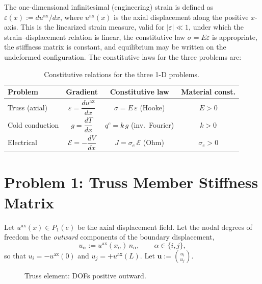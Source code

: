 \documentclass[11pt, a4paper]{article}
\begin{document}
The one-dimensional infinitesimal (engineering) strain is defined as $\varepsilon(x):=du^{\mathrm{ax}}/dx$, where $u^{\mathrm{ax}}(x)$ is the axial displacement along the positive $x$-axis.  This is the linearized strain measure, valid for $|\varepsilon|\ll 1$, under which the strain--displacement relation is linear, the constitutive law $\sigma=E\varepsilon$ is appropriate, the stiffness matrix is constant, and equilibrium may be written on the undeformed configuration.  The constitutive laws for the three problems are:

\begin{table}[H]
\centering
\renewcommand{\arraystretch}{1.5}
\begin{tabular}{@{}lccc@{}}
\toprule
\textbf{Problem} & \textbf{Gradient} & \textbf{Constitutive law} & \textbf{Material const.}\\
\midrule
Truss (axial) & $\varepsilon=\dfrac{du^{\mathrm{ax}}}{dx}$ & $\sigma=E\,\varepsilon$ \;\;(Hooke) & $E>0$\\[6pt]
Cold conduction & $g=\dfrac{dT}{dx}$ & $q^c=k\,g$ \;\;(inv.\ Fourier) & $k>0$\\[6pt]
Electrical & $\mathcal{E}=-\dfrac{dV}{dx}$ & $J=\sigma_e\,\mathcal{E}$ \;\;(Ohm) & $\sigma_e>0$\\
\bottomrule
\end{tabular}
\caption{Constitutive relations for the three 1-D problems.}
\label{tab:const}
\end{table}

\section{Problem 1: Truss Member Stiffness Matrix}

Let $u^{\mathrm{ax}}(x)\in P_1(e)$ be the axial displacement field.  Let the nodal degrees of freedom be the \emph{outward} components of the boundary displacement,
\[
u_\alpha:= u^{\mathrm{ax}}(x_\alpha)\,n_\alpha,\qquad \alpha\in\{i,j\},
\]
so that $u_i=-u^{\mathrm{ax}}(0)$ and $u_j=+u^{\mathrm{ax}}(L)$.  Let $\mathbf{u}:=\binom{u_i}{u_j}$.

\begin{figure}[H]
\centering
{}
\caption{Truss element: DOFs positive outward.}
\label{fig:truss}
\end{figure}
\end{document}
